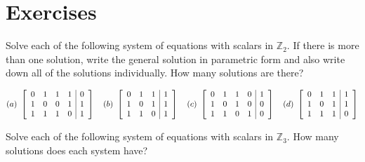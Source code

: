 \section*{Exercises}

\begin{enumialphparenastyle}

\begin{ex}
  Solve each of the following system of equations with scalars in
  $\mathbb{Z}_2$. If there is more than one solution, write the
  general solution in parametric form and also write down all of the
  solutions individually. How many solutions are there?

  \begin{equation*}
    (a)~
    \left[
    \begin{array}{rrrr|r}
      0 & 1 & 1 & 1 & 0 \\
      1 & 0 & 0 & 1 & 1 \\
      1 & 1 & 1 & 0 & 1
    \end{array}
    \right]
    \quad
    (b)~
    \left[
    \begin{array}{rrr|r}
      0 & 1 & 1 & 1 \\
      1 & 0 & 1 & 1 \\
      1 & 1 & 0 & 1
    \end{array}
    \right]
    \quad
    (c)~
    \left[
    \begin{array}{rrrr|r}
      0 & 1 & 1 & 0 & 1 \\
      1 & 0 & 1 & 0 & 0 \\
      1 & 1 & 0 & 1 & 0
    \end{array}
    \right]
    \quad
    (d)~
    \left[
    \begin{array}{rrr|r}
      0 & 1 & 1 & 1 \\
      1 & 0 & 1 & 1 \\
      1 & 1 & 1 & 0
    \end{array}
    \right]
  \end{equation*}
\end{ex}

\begin{ex}
  Solve each of the following system of equations with scalars in
  $\mathbb{Z}_3$. How many solutions does each system have?


\end{ex}
\end{enumialphparenastyle}
